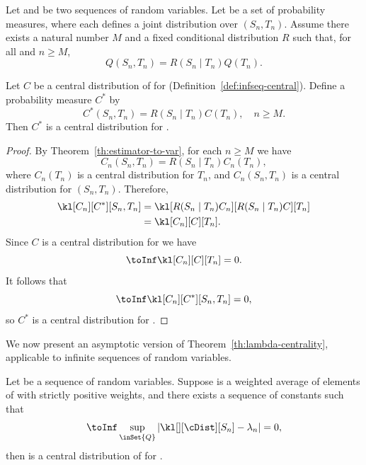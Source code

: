 \begin{theorem}
    \label{th:estimator-to-infseq}
    Let  and  be two sequences of random variables.
    Let \setQ be a set of probability measures, where each  defines a joint distribution
    over $(S_n, T_n)$.
    Assume there exists a natural number $M$ and a fixed conditional distribution $R$
    such that, for all  and $n \geq M$,
    \[
        Q(S_n, T_n) = R(S_n \mid T_n)Q(T_n).
    \]


    Let $C$ be a central distribution of \setQ for  (Definition~\ref{def:infseq-central}).
    Define a probability measure $C^*$ by
    \[
        C^*(S_n, T_n) = R(S_n \mid T_n)C(T_n), \quad n \geq M.
    \]
    Then $C^*$ is a central distribution for .
\end{theorem}

\begin{proof}
    By Theorem~\ref{th:estimator-to-var}, for each $n \geq M$ we have
    \[
        C_n(S_n, T_n) = R(S_n \mid T_n) C_n(T_n),
    \]
    where $C_n(T_n)$ is a central distribution for $T_n$, and $C_n(S_n,  T_n)$ is a central distribution for
    $(S_n, T_n)$.
    Therefore,
    \begin{align*}
        \kl[{C_n}][C^*][S_n, T_n] &= \kl[{R(S_n \mid T_n)C_n}][R(S_n \mid T_n)C][T_n] \\
        &= \kl[{C_n}][C][T_n].
    \end{align*}
    Since $C$ is a central distribution for  we have
    \[
        \toInf \kl[{C_n}][C][T_n] = 0.
    \]
    It follows that
    \[
        \toInf \kl[{C_n}][C^*][S_n, T_n] = 0,
    \]
    so $C^*$ is a central distribution for .
\end{proof}

We now present an asymptotic version of Theorem~\ref{th:lambda-centrality}, applicable to infinite sequences of
random variables.

\begin{theorem}
    \label{th:limiting-centrality}
    Let  be a sequence of random variables.
    Suppose \cDist is a weighted average of elements of \setQ with strictly positive weights,
    and there exists a sequence of constants \infSeq{\lambda} such that
    \[
        \toInf  \sup_{\inSet{Q}} \left|\kl[][\cDist][S_n] - \lambda_n \right| = 0,
    \]
    then \cDist is a central distribution of \setQ for .
\end{theorem}

